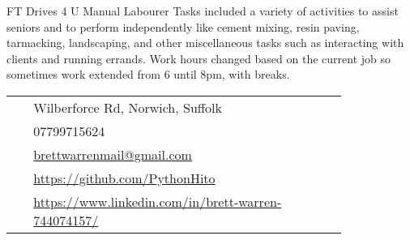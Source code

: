 \documentclass[10pt]{article} %
\begin{document}
\begin{paracol}{2}
{FT} %
{Drives 4 U} %
{Manual Labourer} %
{Tasks included a variety of activities to assist seniors and to perform independently like cement mixing, resin paving, tarmacking, landscaping, and other miscellaneous tasks such as interacting with clients and running errands. Work hours changed based on the current job so sometimes work extended from 6 until 8pm, with breaks.} %


\vspace{-\baselineskip}\medskip %


\switchcolumn %


\parbox[top][0.12\textheight][c]{\linewidth}{ %
	\vspace{-0.04\textheight} %
	\colorbox{shade}{ %
		\begin{supertabular}{p{0.05\linewidth}|p{0.775\linewidth}} %
			\raisebox{-1pt}{\faHome} & Wilberforce Rd, Norwich, Suffolk \\ %
			\raisebox{-1pt}{\faPhone} & 07799715624 \\ %
			\raisebox{0pt}{\small\faEnvelope} & \href{mailto:brettwarrenmail@gmail.com}{brettwarrenmail@gmail.com} \\ %
			\raisebox{-1pt}{\faGithub} & \href{https://github.com/PythonHito}{https://github.com/PythonHito} \\ %
			\raisebox{-1pt}{\faLinkedinSquare} & \href{https://www.linkedin.com/in/brett-warren-744074157/}{https://www.linkedin.com/in/brett-warren-744074157/} \\ %
		\end{supertabular}
	}
}


\end{paracol}
\end{document}
